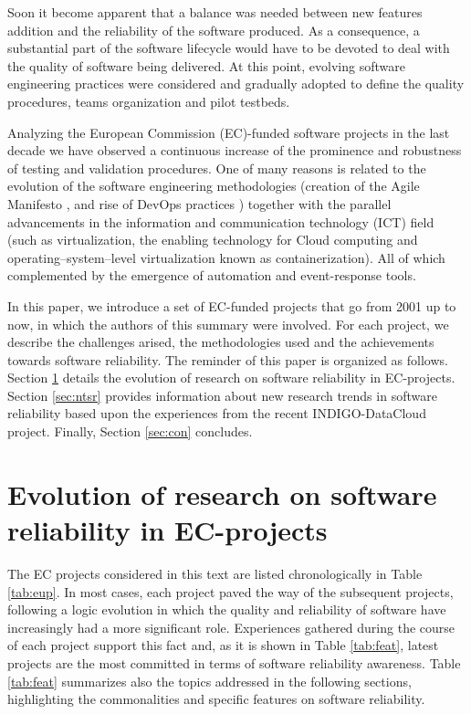 \documentclass[journal]{IEEEtran}
\begin{document}
Soon it become apparent that a balance was needed between new features addition
and the reliability of the software produced. As a consequence, a substantial part of the
software lifecycle would have to be devoted to deal with the quality of software being
delivered. At this point, evolving software engineering practices were
considered and gradually adopted to define the quality procedures, teams
organization and pilot testbeds.

Analyzing the European Commission (EC)-funded software projects in the last decade
we have observed a continuous increase of the prominence and robustness of
testing and validation procedures. One of many reasons is related to the
evolution of the software engineering methodologies (creation of the Agile
Manifesto \cite{agile-manifesto}, and rise of DevOps practices \cite{zhu}) together
with the parallel advancements in the information and communication technology (ICT)
field (such as virtualization, the enabling technology for Cloud computing and 
operating--system--level virtualization known as containerization). All of which
complemented by the emergence of automation and event-response tools.

In this paper, we introduce a set of EC-funded projects
that go from 2001 up to now, in which the authors of this summary were involved.
For each project, we describe the challenges arised, the methodologies used and
the achievements towards software reliability. The reminder of this paper is
organized as follows. Section \ref{sec:ev} details the evolution of research on
software reliability in EC-projects. Section \ref{sec:ntsr} provides
information about new research trends in software reliability based upon the 
experiences from the recent INDIGO-DataCloud project. Finally, Section \ref{sec:con} concludes.

\section{Evolution of research on software reliability in EC-projects}
\label{sec:ev}

The EC projects considered in this text are listed chronologically in Table
\ref{tab:eup}. In most cases, each project paved the way of the subsequent projects,
following a logic evolution in which the quality and reliability of software have
increasingly had a more significant role. Experiences gathered during the 
course of each project support this fact and, as it is shown in Table \ref{tab:feat},
latest projects are the most committed in terms of software reliability awareness.
Table \ref{tab:feat} summarizes also the topics addressed in the following sections, highlighting 
the commonalities and specific features on software reliability.
\end{document}
